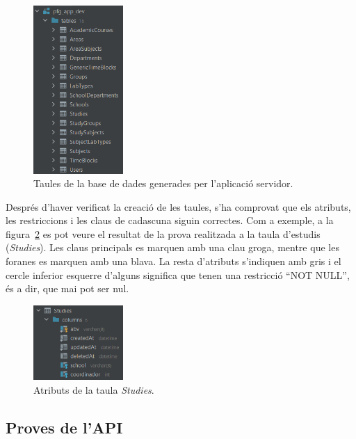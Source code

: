 \documentclass[a4paper,12pt]{ThesisStyle}
\begin{document}
\begin{figure}[H]
  \centering
  \includegraphics[width=0.305\textwidth]{assets/proves/taules.png}
  \caption{\label{img:taules_bdd} Taules de la base de dades generades per l'aplicació servidor.}
\end{figure}

Després d'haver verificat la creació de les taules, s'ha comprovat que els atributs, les restriccions i les claus de cadascuna siguin correctes. Com a exemple, a la figura~\ref{img:atributs_taula} es pot veure el resultat de la prova realitzada a la taula d'estudis (\textit{Studies}). Les claus principals es marquen amb una clau groga, mentre que les foranes es marquen amb una blava. La resta d'atributs s'indiquen amb gris i el cercle inferior esquerre d'alguns significa que tenen una restricció ``NOT NULL'', és a dir, que mai pot ser nul.

\begin{figure}[H]
  \centering
  \includegraphics[width=0.305\textwidth]{assets/proves/atributsTaula.png}
  \caption{\label{img:atributs_taula} Atributs de la taula \textit{Studies}.}
\end{figure}

\newpage

\subsection{Proves de l'API}
\label{subsec:proves_api}
\end{document}
